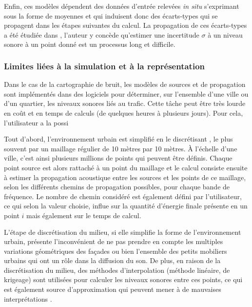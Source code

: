 Enfin, ces modèles dépendent des données d'entrée relevées \textit{in situ} s'exprimant sous la forme de moyennes et qui induisent donc des écarts-types qui se propagent dans les étapes suivantes du calcul. La propagation de ces écarts-types a été étudiée dans \cite{probst2005uncertainties}, l'auteur y concède qu'estimer une incertitude $\sigma$ à un niveau sonore à un point donné est un processus long et difficile.


\subsubsection{Limites liées à la simulation et à la représentation}

Dans le cas de la cartographie de bruit, les modèles de sources et de propagation sont implémentés dans des logiciels pour déterminer, sur l'ensemble d'une ville ou d'un quartier, les niveaux sonores liés au trafic. Cette tâche peut être très lourde en coût et en temps de calculs (de quelques heures à plusieurs jours). Pour cela, l'utilisateur a la possi 

Tout d'abord, l'environnement urbain est simplifié en le discrétisant , le plus souvent par un maillage régulier de 10 mètres par 10 mètres. À l'échelle d'une ville, c'est ainsi plusieurs millions de points qui peuvent être définis. Chaque point source est alors rattaché à un point du maillage et le calcul consiste ensuite à estimer la propagation acoustique entre les sources et les points de ce maillage, selon les différents chemins de propagation possibles, pour chaque bande de fréquence. Le nombre de chemin considéré est également défini par l'utilisateur, ce qui selon la valeur choisie, influe sur la quantité d'énergie finale présente en un point $i$ mais également sur le temps de calcul. 

L'étape de discrétisation du milieu, si elle simplifie la forme de l'environnement urbain, présente l'inconvénient de ne pas prendre en compte les multiples variations géométriques des façades ou bien l'ensemble des petits mobiliers urbains qui ont un rôle dans la diffusion du son.
De plus, en raison de la discrétisation du milieu, des méthodes d'interpolation (méthode linéaire, de krigeage) sont utilisées pour calculer les niveaux sonores entre ces points, ce qui est également source d'approximation qui peuvent mener à de mauvaises interprétations \cite{van_leeuwen_noise_2015}.

